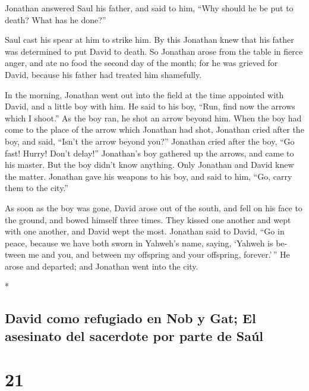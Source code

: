\begin{paracol}{2}
\begin{otherlanguage}{english}
 Jonathan answered Saul his father, and said to him,
``Why should he be put to death? What has he done?''

 Saul cast his spear at him to strike him. By this
Jonathan knew that his father was determined to put David to death.
 So Jonathan arose from the table in fierce anger, and
ate no food the second day of the month; for he was grieved for David,
because his father had treated him shamefully.

 In the morning, Jonathan went out into the field at the
time appointed with David, and a little boy with him.  He
said to his boy, ``Run, find now the arrows which I shoot.'' As the boy
ran, he shot an arrow beyond him.  When the boy had come
to the place of the arrow which Jonathan had shot, Jonathan cried after
the boy, and said, ``Isn't the arrow beyond you?'' 
Jonathan cried after the boy, ``Go fast! Hurry! Don't delay!''
Jonathan's boy gathered up the arrows, and came to his master.
 But the boy didn't know anything. Only Jonathan and
David knew the matter.  Jonathan gave his weapons to his
boy, and said to him, ``Go, carry them to the city.''

 As soon as the boy was gone, David arose out of the
south, and fell on his face to the ground, and bowed himself three
times. They kissed one another and wept with one another, and David wept
the most.  Jonathan said to David, ``Go in peace, because
we have both sworn in Yahweh's name, saying, `Yahweh is between me and
you, and between my offspring and your offspring, forever.'\,'' He arose
and departed; and Jonathan went into the city.

\end{otherlanguage}

\switchcolumn[0]*

\hypertarget{david-como-refugiado-en-nob-y-gat-el-asesinato-del-sacerdote-por-parte-de-sauxfal}{%
\subsection{David como refugiado en Nob y Gat; El asesinato del
sacerdote por parte de
Saúl}\label{david-como-refugiado-en-nob-y-gat-el-asesinato-del-sacerdote-por-parte-de-sauxfal}}

\hypertarget{section-40}{%
\section{21}\label{section-40}}


\end{paracol}
